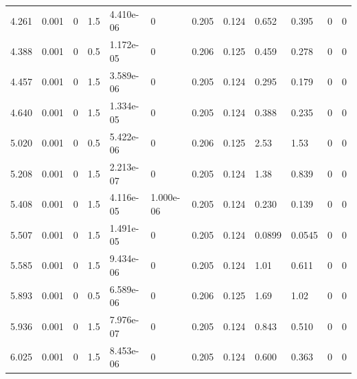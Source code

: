 \documentclass[preview]{standalone}
\begin{document}
{{\begin{tabular}{L{1.2cm}C{1.2cm} C{0.3cm}C{0.5cm} C{1.4cm}C{1.4cm} C{1.4cm}C{1.4cm} C{1.6cm}C{1.6cm} C{1.6cm}C{1.6cm}}
  4.261  &  0.001  & 0     & 1.5 &  4.410e-06  & 0  &  0.205&   0.124& 0.652 & 0.395   &  0 & 0  \\ 
  4.388  &  0.001  & 0     & 0.5 &  1.172e-05  & 0  &  0.206&   0.125& 0.459 & 0.278   &  0 & 0  \\ 
  4.457  &  0.001  & 0     & 1.5 &  3.589e-06  & 0  &  0.205&   0.124& 0.295 & 0.179   &  0 & 0  \\ 
  4.640  &  0.001  & 0     & 1.5 &  1.334e-05  & 0  &  0.205&   0.124& 0.388 & 0.235   &  0 & 0  \\ 
  5.020  &  0.001  & 0     & 0.5 &  5.422e-06  & 0  &  0.206&   0.125& 2.53 & 1.53   &  0 & 0  \\ 
  5.208  &  0.001  & 0     & 1.5 &  2.213e-07  & 0  &  0.205&   0.124& 1.38 & 0.839   &  0 & 0  \\ 
  5.408  &  0.001  & 0     & 1.5 &  4.116e-05  & 1.000e-06  &  0.205&   0.124& 0.230 & 0.139   &  0 & 0  \\ 
  5.507  &  0.001  & 0     & 1.5 &  1.491e-05  & 0  &  0.205&   0.124& 0.0899 & 0.0545   &  0 & 0  \\ 
  5.585  &  0.001  & 0     & 1.5 &  9.434e-06  & 0  &  0.205&   0.124& 1.01 & 0.611   &  0 & 0  \\ 
  5.893  &  0.001  & 0     & 0.5 &  6.589e-06  & 0  &  0.206&   0.125& 1.69 & 1.02   &  0 & 0  \\ 
  5.936  &  0.001  & 0     & 1.5 &  7.976e-07  & 0  &  0.205&   0.124& 0.843 & 0.510   &  0 & 0  \\ 
  6.025  &  0.001  & 0     & 1.5 &  8.453e-06  & 0  &  0.205&   0.124& 0.600 & 0.363   &  0 & 0  \\ 
\hline 
\end{tabular} 

}}
\end{document}
